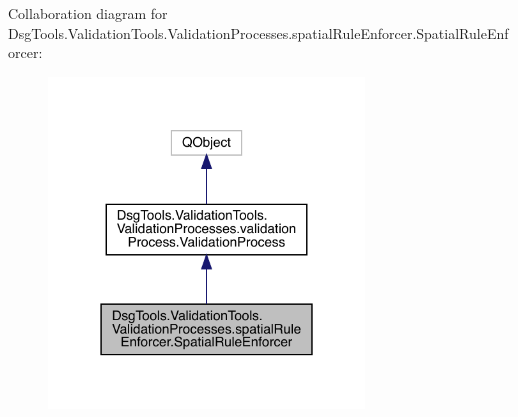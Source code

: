Collaboration diagram for Dsg\+Tools.\+Validation\+Tools.\+Validation\+Processes.\+spatial\+Rule\+Enforcer.\+Spatial\+Rule\+Enforcer\+:
\nopagebreak
\begin{figure}[H]
\begin{center}
\leavevmode
\includegraphics[width=238pt]{class_dsg_tools_1_1_validation_tools_1_1_validation_processes_1_1spatial_rule_enforcer_1_1_spatial_rule_enforcer__coll__graph}
\end{center}
\end{figure}
